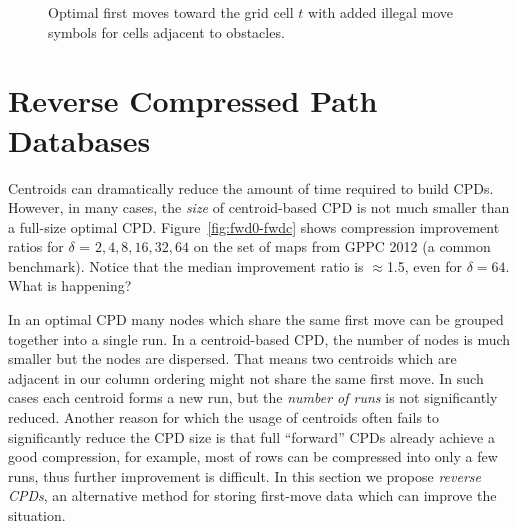 \begin{figure*}[t]
\begin{minipage}{0.3\textwidth}
    \caption{Optimal first moves toward the grid cell $t$ with added illegal move symbols
    for cells adjacent to obstacles. 
    }
    \label{fig:rhh}
  \end{minipage}  
  \end{figure*}  


\section{Reverse Compressed Path Databases}
\label{sec:reverse}

Centroids can dramatically reduce the amount of time required to build
CPDs.  However, in many cases, the \emph{size} of centroid-based CPD 
is not much smaller than a full-size optimal CPD.
Figure~\ref{fig:fwd0-fwdc} shows compression improvement ratios for $\delta$
= $2,4,8,16,32,64$ on the set of maps from GPPC 2012 (a common
benchmark).  Notice that the median improvement ratio is $\approx$1.5,
even for $\delta = 64$.  What is happening?

In an optimal CPD many nodes which share the same first move can be grouped together
into a single run. 
In a centroid-based CPD, the number of nodes is much smaller but the nodes are dispersed.
That means two centroids which are adjacent in our column ordering might not share the same 
first move. In such cases each centroid forms a new run, but the \emph{number of runs} is
not significantly reduced. 
Another reason for which the usage of centroids often fails to significantly reduce the CPD size is that
full ``forward'' CPDs already achieve a good compression, for example, most of rows can be compressed into only a few runs,
thus further improvement is difficult.
In this section we propose {\em reverse CPDs}, an alternative method 
for storing first-move data which can improve the situation.

